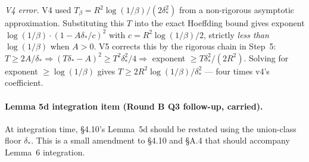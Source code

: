 \documentclass{article}
\newcommand{\deltastar}{\delta_{*}}
\newcommand{\Tbeta}{T_{\beta}}
\begin{document}
\emph{V4 error.}  V4 used $\Tbeta = R^2\log(1/\beta)/(2\deltastar^2)$
from a non-rigorous asymptotic approximation.  Substituting this
$T$ into the exact Hoeffding bound gives exponent $\log(1/\beta)
\cdot (1 - A\deltastar/c)^2$ with $c = R^2\log(1/\beta)/2$, strictly
\emph{less than} $\log(1/\beta)$ when $A > 0$.  V5 corrects this by
the rigorous chain in Step~5: $T \geq 2A/\deltastar \Rightarrow
(T\deltastar - A)^2 \geq T^2\deltastar^2/4 \Rightarrow$ exponent
$\geq T\deltastar^2/(2R^2)$.  Solving for exponent $\geq
\log(1/\beta)$ gives $T \geq 2R^2\log(1/\beta)/\deltastar^2$ — four
times v4's coefficient.

\paragraph{Lemma 5d integration item (Round B Q3 follow-up,
carried).}
At integration time, §4.10's Lemma~5d should be restated using the
union-class floor $\deltastar$.  This is a small amendment to §4.10
and §A.4 that should accompany Lemma~6 integration.
\end{document}
